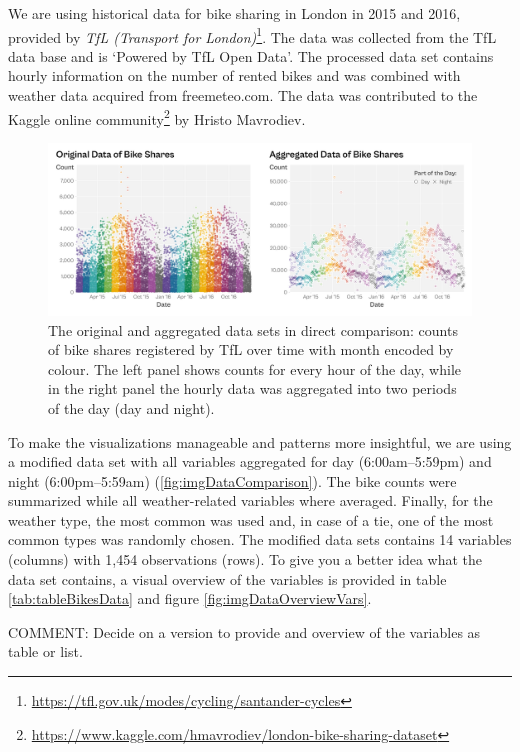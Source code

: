 \documentclass[
]{krantz}
\renewcommand{\href}[2]{#2\footnote{\url{#1}}}
\begin{document}
We are using historical data for bike sharing in London in 2015 and 2016, provided by \href{https://tfl.gov.uk/modes/cycling/santander-cycles}{\emph{TfL (Transport for London)}}. The data was collected from the TfL data base and is `Powered by TfL Open Data'. The processed data set contains hourly information on the number of rented bikes and was combined with weather data acquired from freemeteo.com. The data was contributed to the \href{https://www.kaggle.com/hmavrodiev/london-bike-sharing-dataset}{Kaggle online community} by Hristo Mavrodiev.

\begin{figure}
\centering
\includegraphics{./img/setup-data-comparison-raw-aggregated.png}
\caption{\label{fig:03imgDataComparison}The original and aggregated data sets in direct comparison: counts of bike shares registered by TfL over time with month encoded by colour. The left panel shows counts for every hour of the day, while in the right panel the hourly data was aggregated into two periods of the day (day and night).}
\end{figure}

To make the visualizations manageable and patterns more insightful, we are using a modified data set with all variables aggregated for day (6:00am--5:59pm) and night (6:00pm--5:59am) (\ref{fig:imgDataComparison}). The bike counts were summarized while all weather-related variables where averaged. Finally, for the weather type, the most common was used and, in case of a tie, one of the most common types was randomly chosen. The modified data sets contains 14 variables (columns) with 1,454 observations (rows). To give you a better idea what the data set contains, a visual overview of the variables is provided in table \ref{tab:tableBikesData} and figure \ref{fig:imgDataOverviewVars}.

COMMENT: Decide on a version to provide and overview of the variables as table or list.
\end{document}
